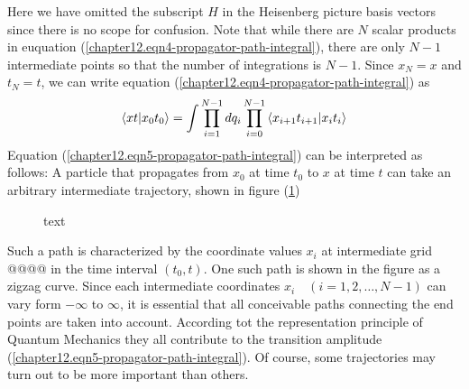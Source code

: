 \begin{enumerate}
		Here we have omitted the subscript $H$ in the Heisenberg picture basis vectors since there is no scope for confusion. Note that while there are $N$ scalar products in euquation (\ref{chapter12.eqn4-propagator-path-integral}), there are only $N-1$ intermediate points so that the number of integrations is $N-1$. Since $x_N = x$ and $t_N= t$, we can write equation (\ref{chapter12.eqn4-propagator-path-integral}) as
		\begin{equation}
			\braket{x t}{x_0 t_0} = \int \prod_{i=1}^{N-1} dq_i \prod_{i=0}^{N-1} \braket{x_{i+1} t_{i+1}}{x_i t_i}
			\label{chapter12.eqn5-propagator-path-integral}
		\end{equation}
		Equation (\ref{chapter12.eqn5-propagator-path-integral}) can be interpreted as follows: A particle that propagates from $x_0$ at time $t_0$ to $x$ at time $t$ can take an arbitrary intermediate trajectory, shown in figure (\ref{chapter12.fig1-propagator-path-integral-trajectory})
		\begin{figure}
			\centering
			\caption{text}
			\label{chapter12.fig1-propagator-path-integral-trajectory}
		\end{figure}
	Such a path is characterized by the coordinate values $x_i$ at intermediate grid @@@@ in the time interval $(t_0,t)$. One such path is shown in the figure as a zigzag curve. Since each intermediate coordinates $x_i\quad (i=1,2,\ldots,N-1)$ can vary form $-\infty$ to $\infty$, it is essential that all conceivable paths connecting the end points are taken into account. According tot the representation principle of Quantum Mechanics they all contribute to the transition amplitude (\ref{chapter12.eqn5-propagator-path-integral}). Of course, some trajectories may turn out to be more important than others.\\
	

\end{enumerate}
